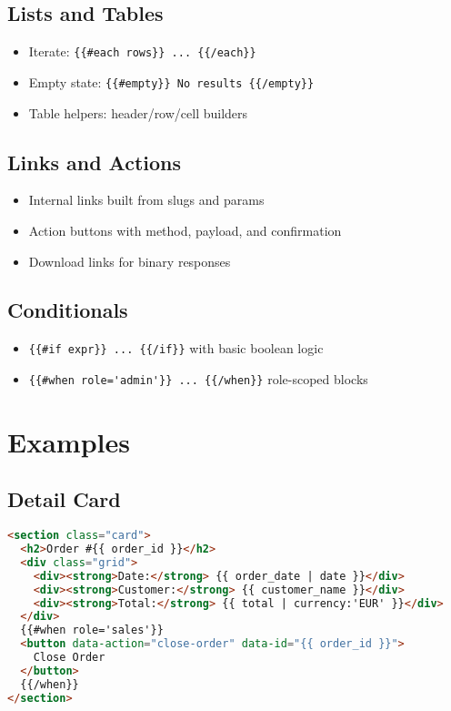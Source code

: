 \subsection{Lists and Tables}
\begin{itemize}
  \item Iterate: \verb|{{#each rows}} ... {{/each}}|
  \item Empty state: \verb|{{#empty}} No results {{/empty}}|
  \item Table helpers: header/row/cell builders
\end{itemize}

\subsection{Links and Actions}
\begin{itemize}
  \item Internal links built from slugs and params
  \item Action buttons with method, payload, and confirmation
  \item Download links for binary responses
\end{itemize}

\subsection{Conditionals}
\begin{itemize}
  \item \verb|{{#if expr}} ... {{/if}}| with basic boolean logic
  \item \verb|{{#when role='admin'}} ... {{/when}}| role-scoped blocks
\end{itemize}

\section{Examples}
\label{sec:wbll-examples}

\subsection{Detail Card}
\begin{lstlisting}[language=HTML,caption={WBLL detail card (illustrative)}]
<section class="card">
  <h2>Order #{{ order_id }}</h2>
  <div class="grid">
    <div><strong>Date:</strong> {{ order_date | date }}</div>
    <div><strong>Customer:</strong> {{ customer_name }}</div>
    <div><strong>Total:</strong> {{ total | currency:'EUR' }}</div>
  </div>
  {{#when role='sales'}}
  <button data-action="close-order" data-id="{{ order_id }}">
    Close Order
  </button>
  {{/when}}
</section>
\end{lstlisting}


